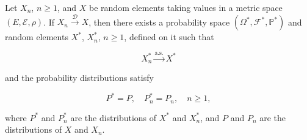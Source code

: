 Let $X_n$, $n \geq 1$, and $X$ be random elements taking values in a metric space $(E, \mathcal{E}, \rho)$. If $X_n \xrightarrow{\mathcal{D}} X$, then there exists a probability space $(\Omega^*, \mathcal{F}^*, \mathbb{P}^*)$ and random elements $X^*$, $X^*_n$, $n \geq 1$, defined on it such that

$$X^*_n \xrightarrow{\text{a.s.}} X^*$$

and the probability distributions satisfy

$$P^* = P, \quad P^*_n = P_n, \quad n \geq 1,$$

where $P^*$ and $P^*_n$ are the distributions of $X^*$ and $X^*_n$, and $P$ and $P_n$ are the distributions of $X$ and $X_n$.